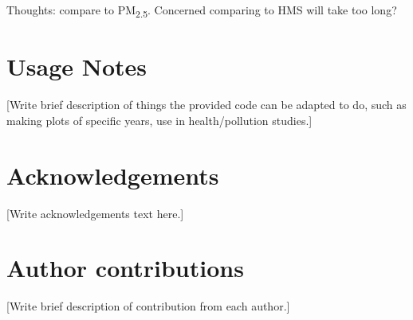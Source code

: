 \documentclass[english]{article}
\begin{document}
Thoughts: compare to PM\textsubscript{2.5}. Concerned comparing to HMS will take too long? 


\section*{Usage Notes}



[Write brief description of things the provided code can be adapted to do, such as making plots of specific years, use in health/pollution studies.]

\section*{Acknowledgements}


[Write acknowledgements text here.]

\section*{Author contributions}


[Write brief description of contribution from each author.]
\end{document}
